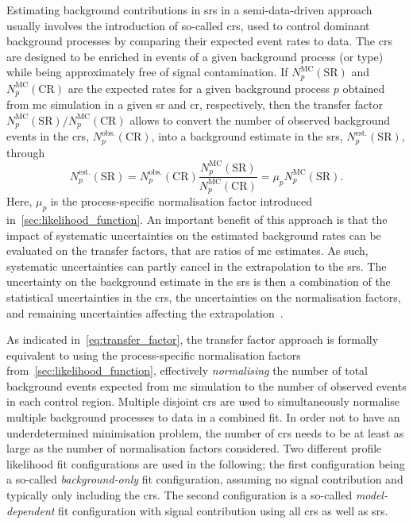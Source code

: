Estimating background contributions in \glspl{sr} in a semi-data-driven approach usually involves the introduction of so-called \glspl{cr}, used to control dominant background processes by comparing their expected event rates to data.
The \glspl{cr} are designed to be enriched in events of a given background process (or type) while being approximately free of signal contamination.
If $N_p^\mathrm{MC}(\mathrm{SR})$ and $N_p^\mathrm{MC}(\mathrm{CR})$ are the expected rates for a given background process $p$ obtained from \gls{mc} simulation in a given \gls{sr} and \gls{cr}, respectively, then the transfer factor $N_p^\mathrm{MC}(\mathrm{SR})/N_p^\mathrm{MC}(\mathrm{CR})$ allows to convert the number of observed background events in the \glspl{cr}, $N_p^\mathrm{obs.}(\mathrm{CR})$, into a background estimate in the \glspl{sr}, $N_p^\mathrm{est.}(\mathrm{SR})$, through
\begin{equation}
	N_p^\mathrm{est.}(\mathrm{SR}) = N_p^\mathrm{obs.}(\mathrm{CR}) \frac{N_p^\mathrm{MC}(\mathrm{SR})}{N_p^\mathrm{MC}(\mathrm{CR})} = \mu_p N_p^\mathrm{MC}(\mathrm{SR}).
	\label{eq:transfer_factor}
\end{equation}
Here, $\mu_p$ is the process-specific normalisation factor introduced in~\cref{sec:likelihood_function}.
An important benefit of this approach is that the impact of systematic uncertainties on the estimated background rates can be evaluated on the transfer factors, that are ratios of \gls{mc} estimates.
As such, systematic uncertainties can partly cancel in the extrapolation to the \glspl{sr}.
The uncertainty on the background estimate in the \glspl{sr} is then a combination of the statistical uncertainties in the \glspl{cr}, the uncertainties on the normalisation factors, and remaining uncertainties affecting the extrapolation~\cite{HistFitter:2014wma}.

As indicated in~\cref{eq:transfer_factor}, the transfer factor approach is formally equivalent to using the process-specific normalisation factors from~\cref{sec:likelihood_function}, effectively \textit{normalising} the number of total background events expected from \gls{mc} simulation to the number of observed events in each control region.
Multiple disjoint \glspl{cr} are used to simultaneously normalise multiple background processes to data in a combined fit.
In order not to have an underdetermined minimisation problem, the number of \glspl{cr} needs to be at least as large as the number of normalisation factors considered.
Two different profile likelihood fit configurations are used in the following; the first configuration being a so-called \textit{background-only} fit configuration, assuming no signal contribution and typically only including the \glspl{cr}.
The second configuration is a so-called \textit{model-dependent} fit configuration with signal contribution using all \glspl{cr} as well as \glspl{sr}.

